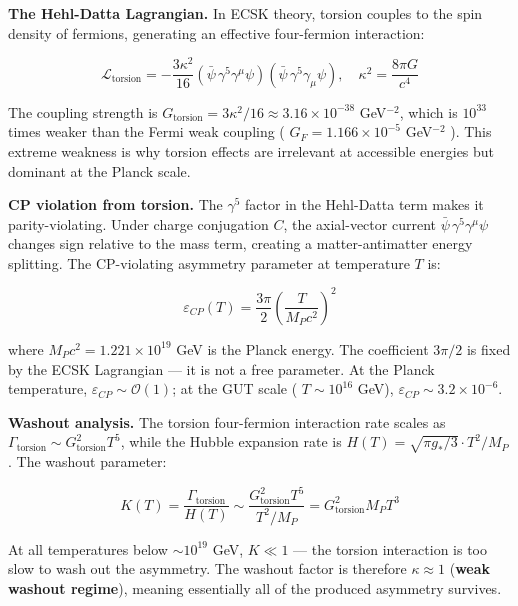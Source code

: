 \documentclass[11pt,a4paper]{article}
\theoremstyle{definition}
\theoremstyle{remark}
\begin{document}
\textbf{The Hehl-Datta Lagrangian.} In ECSK theory, torsion couples to the spin density of fermions, generating an effective four-fermion interaction:


\begin{equation}
\mathcal{L}_{\text{torsion}} = -\frac{3\kappa^2}{16} (\bar{\psi} \, \gamma^5\gamma^\mu\psi)(\bar{\psi} \, \gamma^5\gamma_\mu\psi), \quad \kappa^2 = \frac{8\pi G}{c^4}
\end{equation}


The coupling strength is $G_{\text{torsion}} = 3\kappa^2/16 \approx 3.16 \times 10^{-38}$ GeV$^{-2}$, which is $10^{33}$ times weaker than the Fermi weak coupling ( $G_F = 1.166 \times 10^{-5}$ GeV$^{-2}$ ). This extreme weakness is why torsion effects are irrelevant at accessible energies but dominant at the Planck scale.

\textbf{CP violation from torsion.} The $\gamma^5$ factor in the Hehl-Datta term makes it parity-violating. Under charge conjugation $C$, the axial-vector current $\bar{\psi} \, \gamma^5\gamma^\mu\psi$ changes sign relative to the mass term, creating a matter-antimatter energy splitting. The CP-violating asymmetry parameter at temperature $T$ is:


\begin{equation}
\boxed{\varepsilon_{CP}(T) = \frac{3\pi}{2}\left(\frac{T}{M_P c^2}\right)^2}
\end{equation}


where $M_P c^2 = 1.221 \times 10^{19}$ GeV is the Planck energy. The coefficient $3\pi/2$ is fixed by the ECSK Lagrangian — it is not a free parameter. At the Planck temperature, $\varepsilon_{CP} \sim \mathcal{O}(1)$; at the GUT scale ( $T \sim 10^{16}$ GeV), $\varepsilon_{CP} \sim 3.2 \times 10^{-6}$.

\textbf{Washout analysis.} The torsion four-fermion interaction rate scales as $\Gamma_{\text{torsion}} \sim G_{\text{torsion}}^2 T^5$, while the Hubble expansion rate is $H(T) = \sqrt{\pi g_*/3} \cdot T^2/M_P$. The washout parameter:


\begin{equation}
K(T) = \frac{\Gamma_{\text{torsion}}}{H(T)} \sim \frac{G_{\text{torsion}}^2 T^5}{T^2 / M_P} = G_{\text{torsion}}^2 M_P T^3
\end{equation}


At all temperatures below $\sim 10^{19}$ GeV, $K \ll 1$ — the torsion interaction is too slow to wash out the asymmetry. The washout factor is therefore $\kappa \approx 1$ (\textbf{weak washout regime}), meaning essentially all of the produced asymmetry survives.
\end{document}
